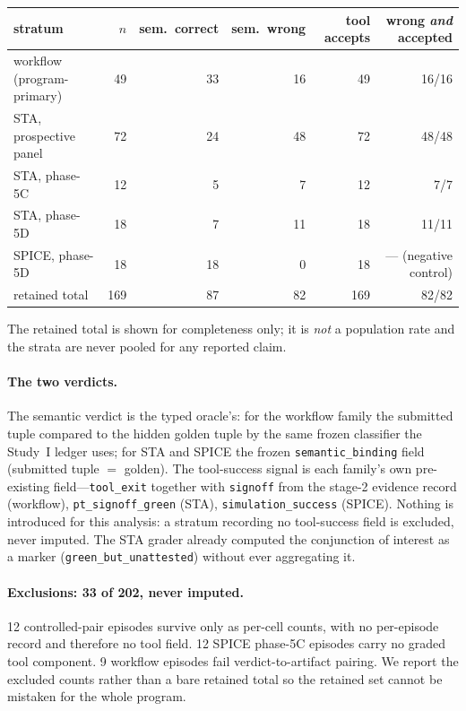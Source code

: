 \documentclass{article}
\begin{document}
\begin{center}\small
\begin{tabular}{lrrrrr}
\toprule
stratum & $n$ & sem.\ correct & sem.\ wrong & tool accepts & wrong \emph{and} accepted \\
\midrule
workflow (program-primary) & 49 & 33 & 16 & 49 & 16/16 \\
STA, prospective panel     & 72 & 24 & 48 & 72 & 48/48 \\
STA, phase-5C              & 12 &  5 &  7 & 12 & 7/7 \\
STA, phase-5D              & 18 &  7 & 11 & 18 & 11/11 \\
SPICE, phase-5D            & 18 & 18 &  0 & 18 & --- (negative control) \\
\midrule
retained total             & 169 & 87 & 82 & 169 & 82/82 \\
\bottomrule
\end{tabular}
\end{center}

The retained total is shown for completeness only; it is \emph{not} a population rate and the strata are never pooled for any reported claim.

\paragraph{The two verdicts.} The semantic verdict is the typed oracle's: for the workflow family the submitted tuple compared to the hidden golden tuple by the same frozen classifier the Study~I ledger uses; for STA and SPICE the frozen \texttt{semantic\_binding} field (submitted tuple $=$ golden). The tool-success signal is each family's own pre-existing field---\texttt{tool\_exit} together with \texttt{signoff} from the stage-2 evidence record (workflow), \texttt{pt\_signoff\_green} (STA), \texttt{simulation\_success} (SPICE). Nothing is introduced for this analysis: a stratum recording no tool-success field is excluded, never imputed. The STA grader already computed the conjunction of interest as a marker (\texttt{green\_but\_unattested}) without ever aggregating it.

\paragraph{Exclusions: 33 of 202, never imputed.} 12 controlled-pair episodes survive only as per-cell counts, with no per-episode record and therefore no tool field. 12 SPICE phase-5C episodes carry no graded tool component. 9 workflow episodes fail verdict-to-artifact pairing. We report the excluded counts rather than a bare retained total so the retained set cannot be mistaken for the whole program.
\end{document}
